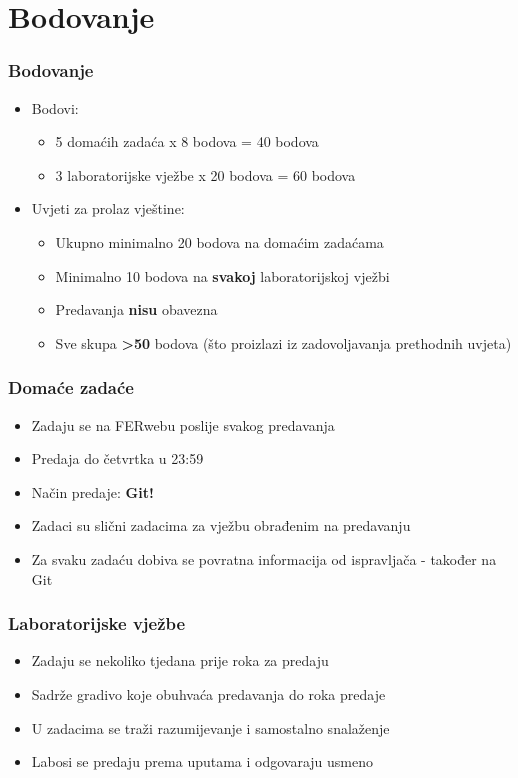 \documentclass{beamer}
\begin{document}
\section{Bodovanje}
\begin{frame}[t]
\frametitle{Bodovanje}
\begin{itemize}
	\item Bodovi:
	\begin{itemize}
		\item 5 domaćih zadaća x 8 bodova = 40 bodova
		\item 3 laboratorijske vježbe x 20 bodova = 60 bodova
	\end{itemize}
	\item Uvjeti za prolaz vještine:
	\begin{itemize}
		\item Ukupno minimalno 20 bodova na domaćim zadaćama
		\item Minimalno 10 bodova na \textbf{svakoj} laboratorijskoj vježbi
		\item Predavanja \textbf{nisu} obavezna
		\item Sve skupa \textbf{\textgreater 50} bodova (što proizlazi iz zadovoljavanja prethodnih uvjeta)
	\end{itemize}
\end{itemize}
\end{frame}

\begin{frame}[t]
\frametitle{Domaće zadaće}
\begin{itemize}
	\item Zadaju se na FERwebu poslije svakog predavanja
	\item Predaja do četvrtka u 23:59
	\item Način predaje: \textbf{Git!}
	\item Zadaci su slični zadacima za vježbu obrađenim na predavanju
	\item Za svaku zadaću dobiva se povratna informacija od ispravljača - također na Git
\end{itemize}
\end{frame}

\begin{frame}[t]
\frametitle{Laboratorijske vježbe}
\begin{itemize}
	\item Zadaju se nekoliko tjedana prije roka za predaju
	\item Sadrže gradivo koje obuhvaća predavanja do roka predaje
	\item U zadacima se traži razumijevanje i samostalno snalaženje
	\item Labosi se predaju prema uputama i odgovaraju usmeno
\end{itemize}
\end{frame}
\end{document}
